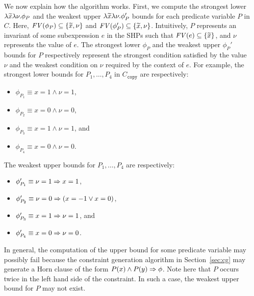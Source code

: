 We now explain how the algorithm works.  First, we compute the strongest 
lower \(\lambda \widetilde{x}\lambda \nu.\phi_P\) and the weakest upper 
\(\lambda \widetilde{x}\lambda \nu.\phi_P'\) bounds for each predicate 
variable \(P\) in \(C\).  Here, \(\mathit{FV}({\phi_P}) \subseteq 
\{{\widetilde{x},\nu}\}\) and \(\mathit{FV}({\phi_P'}) \subseteq \{{\widetilde{x},\nu}\}\).  
Intuitively, \(P\) represents an invariant of some subexpression \(e\) 
in the SHPs such that \(\mathit{FV}({e}) \subseteq \{{\widetilde{x}}\}\), and \(\nu\) 
represents the value of \(e\).  The strongest lower \(\phi_P\) and the 
weakest upper \(\phi_{P}'\) bounds for \(P\) respectively represent the 
strongest condition satisfied by the value \(\nu\) and the weakest 
condition on \(\nu\) required by the context of \(e\).  For example, the 
strongest lower bounds for \(P_1,\dots,P_4\) in \(C_{\texttt{copy}}\) 
are respectively:
\begin{itemize}
\item \(\phi_{P_1}\equiv x=1 \land \nu=1\), 
\item \(\phi_{P_2}\equiv x=0 \land \nu=0\),
\item \(\phi_{P_3}\equiv x=1 \land \nu=1\), and 
\item \(\phi_{P_4}\equiv x=0 \land \nu=0\).
\end{itemize}
The weakest upper bounds for \(P_1,\dots,P_4\) are respectively:
\begin{itemize}
\item \(\phi_{P_1}'\equiv \nu=1 \Rightarrow x=1\), 
\item \(\phi_{P_2}'\equiv \nu=0 \Rightarrow (x=-1 \lor x=0)\),
\item \(\phi_{P_3}'\equiv x=1 \Rightarrow \nu=1\), and 
\item \(\phi_{P_4}'\equiv x=0 \Rightarrow \nu=0\).
\end{itemize}

In general, the computation of the upper bound for some predicate 
variable may possibly fail because the constraint generation algorithm 
in Section~\ref{sec:cg} may generate a Horn clause of the form \(P(x) 
\land P(y) \Rightarrow \phi\).  Note here that \(P\) occurs twice in the left 
hand side of the constraint.  In such a case, the weakest upper bound 
for \(P\) may not exist.

